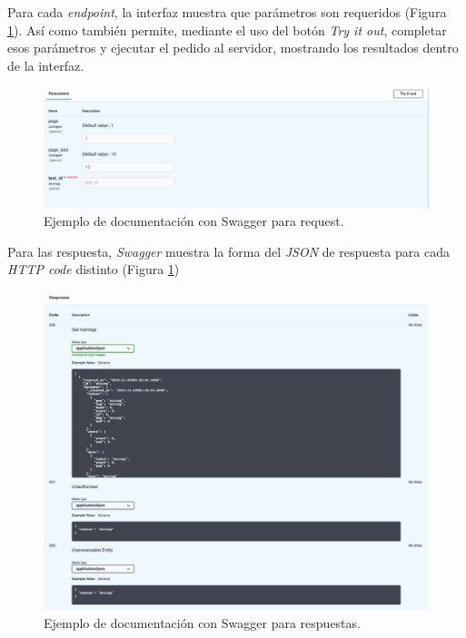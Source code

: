 \documentclass[12pt,a4paper,]{scrartcl}
\begin{document}
Para cada \emph{endpoint}, la interfaz muestra que parámetros son requeridos (Figura \ref{fig:logic-swagger-request}). Así como también permite, mediante el uso del botón \emph{Try it out}, completar esos parámetros y ejecutar el pedido al servidor, mostrando los resultados dentro de la interfaz.

\begin{figure}[H]

{\centering \includegraphics{assets/logic/swagger-request.pdf} 

}

\caption{Ejemplo de documentación con Swagger para request.}\label{fig:logic-swagger-request}
\end{figure}

Para las respuesta, \emph{Swagger} muestra la forma del \emph{JSON} de respuesta para cada \emph{HTTP code} distinto (Figura \ref{fig:logic-swagger-request})

\begin{figure}[H]

{\centering \includegraphics{assets/logic/swagger-responses.pdf} 

}

\caption{Ejemplo de documentación con Swagger para respuestas.}\label{fig:logic-swagger-responses}
\end{figure}
\end{document}
